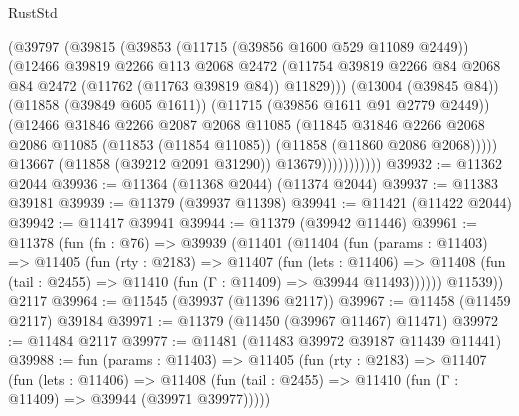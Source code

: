 \begin{lexlean}{RustStd}
\begin{coremodule}
                        (@39797
                          (@39815
                            (@39853
                              (@11715 (@39856 @1600 @529 @11089 @2449))
                              (@12466
                                @39819
                                @2266
                                @113
                                @2068
                                @2472
                                (@11754
                                  @39819
                                  @2266
                                  @84
                                  @2068
                                  @84
                                  @2472
                                  (@11762 (@11763 @39819 @84))
                                  @11829)))
                            (@13004 (@39845 @84))
                            (@11858 (@39849 @605 @1611))
                            (@11715 (@39856 @1611 @91 @2779 @2449))
                            (@12466
                              @31846
                              @2266
                              @2087
                              @2068
                              @11085
                              (@11845
                                @31846
                                @2266
                                @2068
                                @2086
                                @11085
                                (@11853 (@11854 @11085))
                                (@11858 (@11860 @2086 @2068)))))
                          @13667
                          (@11858 (@39212 @2091 @31290))
                          @13679)))))))))))
@39932 := @11362 @2044
@39936 := @11364 (@11368 @2044) (@11374 @2044)
@39937 := @11383 @39181
@39939 := @11379 (@39937 @11398)
@39941 := @11421 (@11422 @2044)
@39942 := @11417 @39941
@39944 := @11379 (@39942 @11446)
@39961 := @11378
    (fun (fn : @76) =>
    @39939
      (@11401
        (@11404
          (fun (params : @11403) =>
          @11405
            (fun (rty : @2183) =>
            @11407
              (fun (lets : @11406) =>
              @11408 (fun (tail : @2455) => @11410 (fun (Γ : @11409) => @39944 @11493))))))
        @11539))
    @2117
@39964 := @11545 (@39937 (@11396 @2117))
@39967 := @11458 (@11459 @2117) @39184
@39971 := @11379 (@11450 (@39967 @11467) @11471)
@39972 := @11484 @2117
@39977 := @11481 (@11483 @39972 @39187 @11439 @11441)
@39988 := fun (params : @11403) =>
  @11405
    (fun (rty : @2183) =>
    @11407
      (fun (lets : @11406) =>
      @11408 (fun (tail : @2455) => @11410 (fun (Γ : @11409) => @39944 (@39971 @39977)))))

\end{coremodule}
\end{lexlean}
